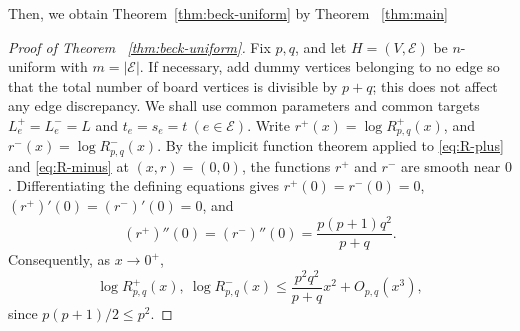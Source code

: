 \documentclass[twoside,12pt]{article}
\numberwithin{equation}{section}
\begin{document}
Then, we obtain Theorem~\ref{thm:beck-uniform} by Theorem ~\ref{thm:main}

\begin{proof}[Proof of Theorem ~\ref{thm:beck-uniform}]
Fix $p,q$, and let
$H=(V,\mathcal E)$ be $n$-uniform with $m=|\mathcal E|$. If necessary, add
dummy vertices belonging to no edge so that the total number of board vertices
is divisible by $p+q$; this does not affect any edge discrepancy.  We shall use
common parameters and common targets
$L_e^+=L_e^-=L$ and
$t_e=s_e=t
~ (e\in\mathcal E)$.
Write
$r^+(x)=\log R^+_{p,q}(x)$,
and $r^-(x)=\log R^-_{p,q}(x)$.
By the implicit function theorem applied to \eqref{eq:R-plus} and
\eqref{eq:R-minus} at $(x,r)=(0,0)$, the functions $r^+$ and $r^-$ are smooth
near $0$.  Differentiating the defining equations gives
$r^+(0)=r^-(0)=0$,
$(r^+)'(0)=(r^-)'(0)=0$,
and
\[
        (r^+)''(0)=(r^-)''(0)=
        \frac{p(p+1)q^2}{p+q}.
\]
Consequently, as $x\to0^+$,
\begin{equation}\label{eq:R-Taylor-for-corollary}
        \log R^+_{p,q}(x),\ \log R^-_{p,q}(x)
        \le
        \frac{p^2q^2}{p+q}x^2+O_{p,q}(x^3),
\end{equation}
since $p(p+1)/2\le p^2$.


\end{proof}
\end{document}
